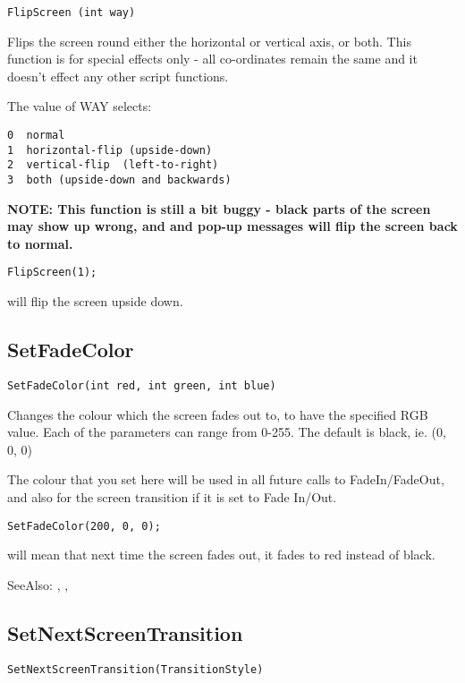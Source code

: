 \begin{verbatim}
FlipScreen (int way)
\end{verbatim}
Flips the screen round either the horizontal or vertical axis, or both.
This function is for special effects only - all co-ordinates remain the
same and it doesn't effect any other script functions.

The value of WAY selects:
\begin{verbatim}
0  normal
1  horizontal-flip (upside-down)
2  vertical-flip  (left-to-right)
3  both (upside-down and backwards)
\end{verbatim}
\bf{NOTE}: This function is still a bit buggy - black parts of the screen may
show up wrong, and and pop-up messages will flip the screen back to normal.

\begin{verbatim}
FlipScreen(1);
\end{verbatim}
will flip the screen upside down.


\subsection{SetFadeColor}\label{SetFadeColor}%

\begin{verbatim}
SetFadeColor(int red, int green, int blue)
\end{verbatim}

Changes the colour which the screen fades out to, to have the specified RGB value. Each of the
parameters can range from 0-255. The default is black, ie. (0, 0, 0)

The colour that you set here will be used in all future calls to FadeIn/FadeOut, and also
for the screen transition if it is set to Fade In/Out.

\begin{verbatim}
SetFadeColor(200, 0, 0);
\end{verbatim}
will mean that next time the screen fades out, it fades to red instead of black.

SeeAlso: , ,


\subsection{SetNextScreenTransition}\label{SetNextScreenTransition}%

\begin{verbatim}
SetNextScreenTransition(TransitionStyle)
\end{verbatim}

